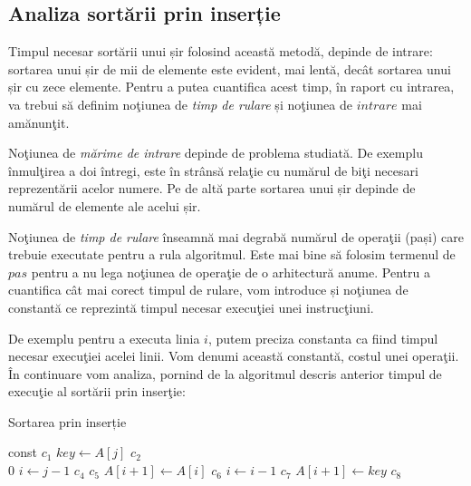 \subsection{Analiza sortării prin inserție}


Timpul necesar sortării unui șir folosind această metodă, depinde de intrare: sortarea unui șir de mii de elemente este evident, mai lentă, decât sortarea unui șir cu zece elemente. Pentru a putea cuantifica acest timp, în raport cu intrarea, va trebui să definim noţiunea de \textit{timp de rulare} și noţiunea de $intrare$ mai amănunţit.

Noţiunea de \textit{mărime de intrare} depinde de problema studiată. De exemplu înmulţirea a doi întregi, este în strânsă relaţie cu numărul de biţi necesari reprezentării acelor numere. Pe de altă parte sortarea unui șir depinde de numărul de elemente ale acelui șir.

Noţiunea de \textit{timp de rulare} înseamnă mai degrabă numărul de operaţii (pași) care trebuie executate pentru a rula algoritmul. Este mai bine să folosim termenul de $pas$ pentru a nu lega noţiunea de operaţie de o arhitectură anume. Pentru a cuantifica cât mai corect timpul de rulare, vom introduce și noţiunea de constantă ce reprezintă timpul necesar execuţiei unei instrucţiuni.

De exemplu pentru a executa linia $i$, putem preciza constanta ca fiind timpul necesar execuţiei acelei linii. Vom denumi această constantă, costul unei operaţii. În continuare vom analiza, pornind de la algoritmul descris anterior timpul de execuţie al sortării prin inserţie:
\begin{algorithm}
	\caption{Sortarea prin inserție}\label{alg:insertie}
	\begin{algorithmic}[1]
	
	 \hfill const  \tab{}
		  \hfill $c_1$  \tab{}
		\State $key\gets A[j]$ 		 	 \hfill $c_2$  \tab{} \\
		 \hfill $0$  \tab{}
		\State $i \gets j-1$ 			\hfill $c_4$  \tab{}
			\hfill $c_5$   \tab{}
		\State $A[i+1] \gets A[i]$ 				\hfill $c_6$   \tab{}
		\State $i \gets i-1$ 				\hfill $c_7$  		\tab{}
		\EndWhile\label{pseudocodwhile}	
		\State $A[i+1] \gets key$ 				\hfill $c_8$  \tab{}
		\EndFor		
		\EndProcedure
	\end{algorithmic}
\end{algorithm}



